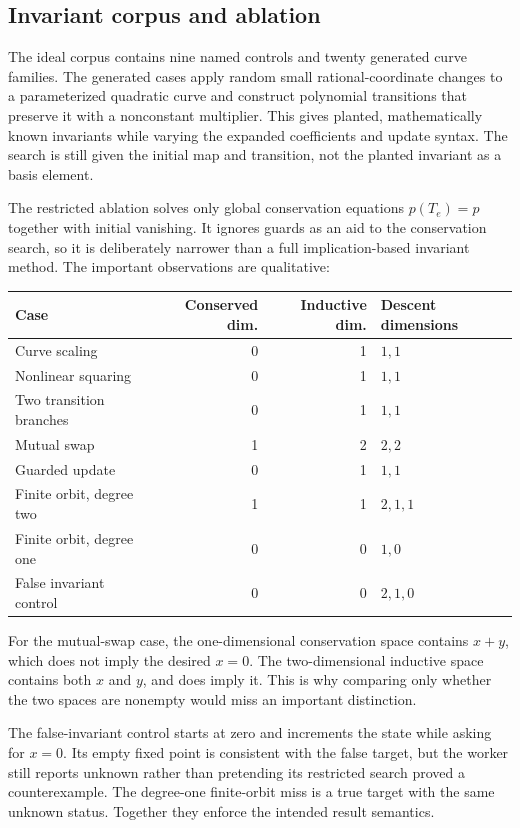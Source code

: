 \subsection{Invariant corpus and ablation}

The ideal corpus contains nine named controls and twenty generated curve
families. The generated cases apply random small rational-coordinate changes to
a parameterized quadratic curve and construct polynomial transitions that
preserve it with a nonconstant multiplier. This gives planted, mathematically
known invariants while varying the expanded coefficients and update syntax.
The search is still given the initial map and transition, not the planted
invariant as a basis element.

The restricted ablation solves only global conservation equations
$p(T_e)=p$ together with initial vanishing. It ignores guards as an aid to the
conservation search, so it is deliberately narrower than a full
implication-based invariant method. The important observations are qualitative:

\begin{center}
\begin{tabular}{@{}lrrl@{}}\toprule
Case & Conserved dim. & Inductive dim. & Descent dimensions \\
\midrule
Curve scaling & 0 & 1 & $1,1$ \\
Nonlinear squaring & 0 & 1 & $1,1$ \\
Two transition branches & 0 & 1 & $1,1$ \\
Mutual swap & 1 & 2 & $2,2$ \\
Guarded update & 0 & 1 & $1,1$ \\
Finite orbit, degree two & 1 & 1 & $2,1,1$ \\
Finite orbit, degree one & 0 & 0 & $1,0$ \\
False invariant control & 0 & 0 & $2,1,0$ \\
\bottomrule\end{tabular}
\end{center}

For the mutual-swap case, the one-dimensional conservation space contains
$x+y$, which does not imply the desired $x=0$. The two-dimensional inductive
space contains both $x$ and $y$, and does imply it. This is why comparing only
whether the two spaces are nonempty would miss an important distinction.

The false-invariant control starts at zero and increments the state while
asking for $x=0$. Its empty fixed point is consistent with the false target,
but the worker still reports unknown rather than pretending its restricted
search proved a counterexample. The degree-one finite-orbit miss is a true
target with the same unknown status. Together they enforce the intended result
semantics.

